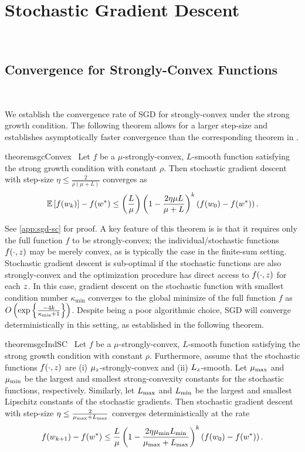 
\chapter{Stochastic Gradient Descent}~\label{ch:sgd}


\section{Convergence for Strongly-Convex Functions}~\label{sec:sgd-sc}

We establish the convergence rate of SGD for strongly-convex under the strong growth condition. 
The following theorem allows for a larger step-size and establishes asymptotically faster convergence than the corresponding theorem in \citet{vaswani2019fast}.

\begin{restatable}{theorem}{sgcConvex}~\label{thm:sgc-convex}
    Let \( f \) be a \( \mu \)-strongly-convex, \( L \)-smooth function satisfying the strong growth condition with constant \( \rho \).
    Then stochastic gradient descent with step-size \( \eta \leq \frac{2}{\rho(\mu + L)} \) converges as 
    \[ \mathbb{E}\left[f(w_k)\right] - f(w^*) \leq \left(\frac{L}{\mu}\right)\left(1 - \frac{2\eta \mu L}{\mu + L}\right)^k \left(f(w_0) - f(w^*)\right). \] 
\end{restatable}

See \autoref{app:sgd-sc} for proof.
A key feature of this theorem is is that it requires only the full function \( f \) to be strongly-convex; the individual/stochastic functions \( f(\cdot, z) \) may be merely convex, as is typically the case in the finite-sum setting.
Stochastic gradient descent is sub-optimal if the stochastic functions are also strongly-convex and the optimization procedure has direct access to \( f(\cdot, z ) \) for each \( z \).
In this case, gradient descent on the stochastic function with smallest condition number \( \kappa_{\text{min}} \) converges to the global minimize of the full function \( f \) as \( O\left(\exp\left\{\frac{-4 k}{\kappa_{\text{min}} + 1}\right\}\right) \).
Despite being a poor algorithmic choice, SGD will converge deterministically in this setting, as established in the following theorem.

\begin{restatable}{theorem}{sgcIndSC}~\label{thm:sgc-ind-sc}
    Let \( f \) be a \( \mu \)-strongly-convex, \( L \)-smooth function satisfying the strong growth condition with constant \( \rho \).
    Furthermore, assume that the stochastic functions \( f(\cdot, z) \) are (i) \( \mu_z \)-strongly-convex and (ii) \( L_z \)-smooth.
    Let \( \mu_{\text{max}} \) and \( \mu_{\text{min}} \) be the largest and smallest strong-convexity constants for the stochastic functions, respectively.
    Similarly, let \( L_{\text{max}} \) and \( L_{\text{min}} \) be the largest and smallest Lipschitz constants of the stochastic gradients.
    Then stochastic gradient descent with step-size \( \eta \leq \frac{2}{\mu_{\text{max}} + L_{\text{max}}} \) converges deterministically at the rate 
    \[ f(w_{k+1}) - f(w^*) \leq \frac{L}{\mu} \left(1 - \frac{2 \eta \mu_{\text{min}} L_{\text{min}}}{\mu_{\text{max}} + L_{\text{max}}}\right)^k \left(f(w_0) - f(w^*)\right). \] 
\end{restatable}


